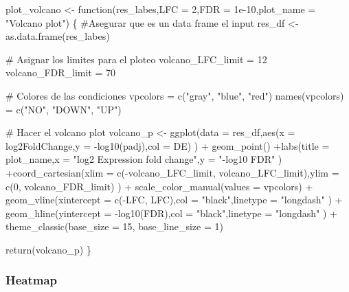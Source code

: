 \documentclass[
  9pt,
]{article}
\newenvironment{Shaded}{\begin{snugshade}}{\end{snugshade}}
\newcommand{\NormalTok}[1]{\textcolor[rgb]{0.00,0.23,0.31}{#1}}
\begin{document}
\begin{Shaded}
\begin{Highlighting}[]

\NormalTok{plot\_volcano \textless{}{-} function(res\_labes,LFC = 2,FDR = 1e{-}10,plot\_name = "Volcano plot") \{}
\NormalTok{  \#Asegurar que es un data frame el input}
\NormalTok{  res\_df \textless{}{-} as.data.frame(res\_labes)}

\NormalTok{  \# Asignar los limites para el ploteo}
\NormalTok{  volcano\_LFC\_limit = 12}
\NormalTok{  volcano\_FDR\_limit = 70}

\NormalTok{  \# Colores de las condiciones}
\NormalTok{  vpcolors = c("gray", "blue", "red")}
\NormalTok{  names(vpcolors) = c("NO", "DOWN", "UP")}

\NormalTok{  \# Hacer el volcano plot}
\NormalTok{  volcano\_p \textless{}{-} ggplot(data = res\_df,aes(x = log2FoldChange,y = {-}log10(padj),col = DE)}
\NormalTok{  ) +}
\NormalTok{    geom\_point() +labs(title = plot\_name,x = "log2 Expression fold change",y = "{-}log10 FDR"}
\NormalTok{    ) +coord\_cartesian(xlim = c({-}volcano\_LFC\_limit, volcano\_LFC\_limit),ylim = c(0, volcano\_FDR\_limit)}
\NormalTok{    ) +}
\NormalTok{    scale\_color\_manual(values = vpcolors) +}
\NormalTok{    geom\_vline(xintercept = c({-}LFC, LFC),col = "black",linetype = "longdash"}
\NormalTok{    ) +}
\NormalTok{    geom\_hline(yintercept = {-}log10(FDR),col = "black",linetype = "longdash"}
\NormalTok{    ) +}
\NormalTok{    theme\_classic(base\_size = 15, base\_line\_size = 1)}

\NormalTok{  return(volcano\_p)}
\NormalTok{\}}
\end{Highlighting}
\end{Shaded}

\subsubsection{Heatmap}\label{plot_Heatmap}
\end{document}
